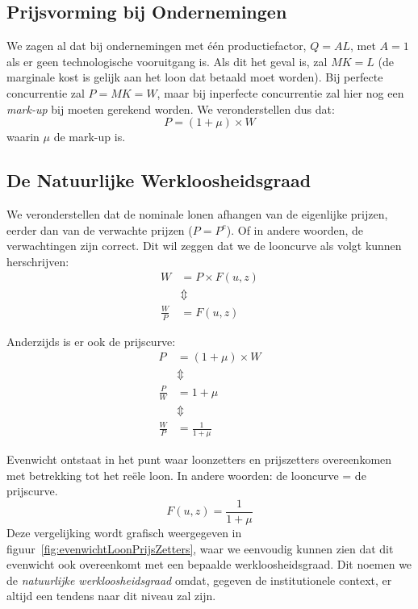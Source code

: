 \subsection{Prijsvorming bij Ondernemingen}
We zagen al dat bij ondernemingen met \'e\'en productiefactor, $Q=AL$, met $A=1$ als er geen technologische vooruitgang is. Als dit het geval is, zal $MK = L$ (de marginale kost is gelijk aan het loon dat betaald moet worden). Bij perfecte concurrentie zal $P = MK = W$, maar bij inperfecte concurrentie zal hier nog een \textit{mark-up} bij moeten gerekend worden. We veronderstellen dus dat:
\begin{equation}
  P = (1 + \mu)\times W
\end{equation}
waarin $\mu$ de mark-up is.


\subsection{De Natuurlijke Werkloosheidsgraad}
We veronderstellen dat de nominale lonen afhangen van de eigenlijke prijzen, eerder dan van de verwachte prijzen ($P = P^e$). Of in andere woorden, de verwachtingen zijn correct. Dit wil zeggen dat we de looncurve als volgt kunnen herschrijven:
\begin{align*}
  W &= P \times F(u,z)\\
  &\Updownarrow \\
  \frac{W}{P} &= F(u,z)
\end{align*}

Anderzijds is er ook de prijscurve:
\begin{align*}
  P &= (1+\mu) \times W\\
  &\Updownarrow \\
  \frac{P}{W} & = 1 + \mu \\
  &\Updownarrow \\
  \frac{W}{P} &= \frac{1}{1 + \mu}
\end{align*}

Evenwicht ontstaat in het punt waar loonzetters en prijszetters overeenkomen met betrekking tot het re\"ele loon. In andere woorden: de looncurve = de prijscurve.
\begin{equation}
  F(u,z) = \frac{1}{1+\mu}
\end{equation}
Deze vergelijking wordt grafisch weergegeven in figuur~\ref{fig:evenwichtLoonPrijsZetters}, waar we eenvoudig kunnen zien dat dit evenwicht ook overeenkomt met een bepaalde werkloosheidsgraad. Dit noemen we de \textit{natuurlijke werkloosheidsgraad} omdat, gegeven de institutionele context, er altijd een tendens naar dit niveau zal zijn.

